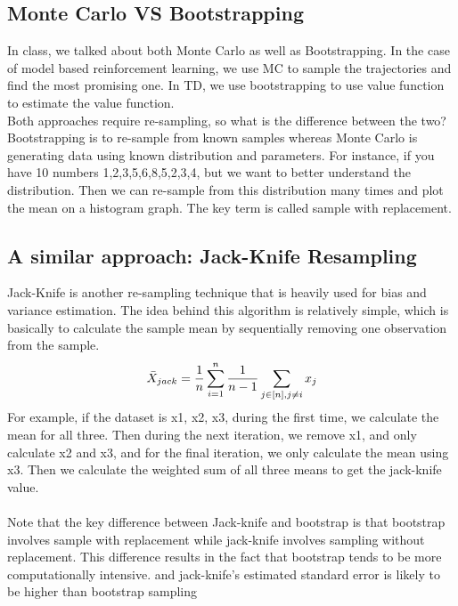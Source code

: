 \documentclass[11pt]{article}
\begin{document}
\subsection{Monte Carlo VS Bootstrapping}
In class, we talked about both Monte Carlo as well as Bootstrapping. In the case of model based reinforcement learning, we use MC to sample the trajectories and find the most promising one. In TD, we use bootstrapping to use value function to estimate the value function.\\
Both approaches require re-sampling, so what is the difference between the two? \\
Bootstrapping is to re-sample from known samples whereas Monte Carlo is generating data using known distribution and parameters. For instance, if you have 10 numbers {1,2,3,5,6,8,5,2,3,4}, but we want to better understand the distribution. Then we can re-sample from this distribution many times and plot the mean on a histogram graph. The key term is called sample with replacement. 

\subsection{A similar approach: Jack-Knife Resampling}
Jack-Knife is another re-sampling technique that is heavily used for bias and variance estimation. The idea behind this algorithm is relatively simple, which is basically to calculate the sample mean by sequentially removing one observation from the sample. 
$$\Bar{X}_{jack} = \dfrac{1}{n} \sum_{i=1}^n \dfrac{1}{n-1} \sum_{j\in [n], j\neq i} {x_j}$$
For example, if the dataset is x1, x2, x3, during the first time, we calculate the mean for all three. Then during the next iteration, we remove x1, and only calculate x2 and x3, and for the final iteration, we only calculate the mean using x3. Then we calculate the weighted sum of all three means to get the jack-knife value. \\ \\
Note that the key difference between Jack-knife and bootstrap is that bootstrap involves sample with replacement while jack-knife involves sampling without replacement. This difference results in the fact that bootstrap tends to be more computationally intensive. and jack-knife's estimated standard error is likely to be higher than bootstrap sampling 
\end{document}
